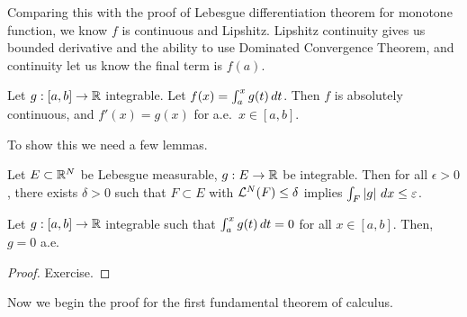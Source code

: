 \documentclass[a4paper]{article}
\begin{document}
\begin{remark}
  Comparing this with the proof of Lebesgue differentiation theorem for
  monotone function, we know $f$ is continuous and Lipshitz. Lipshitz
  continuity gives us bounded derivative and the ability to use Dominated
  Convergence Theorem, and continuity let us know the final term is
  $f(a)$.
\end{remark}

\begin{thm}[FTC 1]
  Let $g : [a, b] \to \mathbb{R}$ integrable. Let $f(x) = \int_a^x g(t) \, d t$.
  Then $f$ is absolutely continuous, and $f'(x) = g(x)$ for a.e.\ $x \in
    [a, b]$.
\end{thm}

To show this we need a few lemmas.

\begin{lemma}
  Let $E \subset \mathbb{R}^N$ be Lebesgue measurable, $g : E \to \mathbb{R}$ be
  integrable. Then for all $\epsilon > 0$, there exists $\delta > 0$ such
  that $F \subset E$ with $\mathcal{L}^N (F) \leq \delta$ implies $\int_F \left\lvert g\right\rvert
    \, d x \leq \varepsilon$.
\end{lemma}

\begin{lemma}
  Let $g : [a, b] \to \mathbb{R}$ integrable such that $\int_a^x g(t) \, d t = 0$
  for all $x \in [a, b]$. Then, $g = 0$ a.e.
\end{lemma}

\begin{proof}
  Exercise.
\end{proof}

Now we begin the proof for the first fundamental theorem of calculus.
\end{document}
